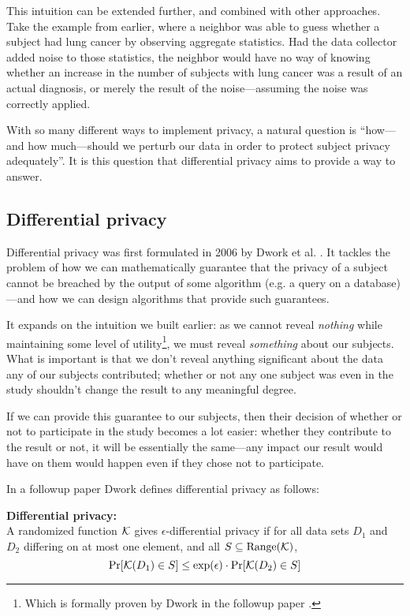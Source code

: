This intuition can be extended further, and combined with other approaches. Take the example from earlier, where a neighbor was able to guess whether a subject had lung cancer by observing aggregate statistics. Had the data collector added noise to those statistics, the neighbor would have no way of knowing whether an increase in the number of subjects with lung cancer was a result of an actual diagnosis, or merely the result of the noise---assuming the noise was correctly applied. \bigskip

With so many different ways to implement privacy, a natural question is ``how---and how much---should we perturb our data in order to protect subject privacy adequately''. It is this question that differential privacy aims to provide a way to answer.

\subsection{Differential privacy \label{sec:promise}} 

Differential privacy was first formulated in 2006 by Dwork et al. \cite{dworketal2006}. It tackles the problem of how we can mathematically guarantee that the privacy of a subject cannot be breached by the output of some algorithm (e.g. a query on a database)---and how we can design algorithms that provide such guarantees.

It expands on the intuition we built earlier: as we cannot reveal \emph{nothing} while maintaining some level of utility\footnote{Which is formally proven by Dwork in the followup paper \cite{dwork2006_diffpriv}.}, we must reveal \emph{something} about our subjects. What is important is that we don't reveal anything significant about the data any of our subjects contributed; whether or not any one subject was even in the study shouldn't change the result to any meaningful degree.

If we can provide this guarantee to our subjects, then their decision of whether or not to participate in the study becomes a lot easier: whether they contribute to the result or not, it will be essentially the same---any impact our result would have on them would happen even if they chose not to participate.

In a followup paper \cite{dwork2006_diffpriv} Dwork defines differential privacy as follows:

\begin{mdframed}
    \textbf{Differential privacy:}\\A randomized function $\mathcal{K}$ gives $\epsilon$-differential privacy if for all data sets $D_1$ and $D_2$ differing on at most one element, and all $S \subseteq \text{Range}(\mathcal{K})$,
    \begin{equation}\label{eq:diffpriv}
        \Pr[\mathcal{K}(D_1) \in S] \leq \exp(\epsilon) \cdot \Pr[\mathcal{K}(D_2) \in S]
    \end{equation}
\end{mdframed}

